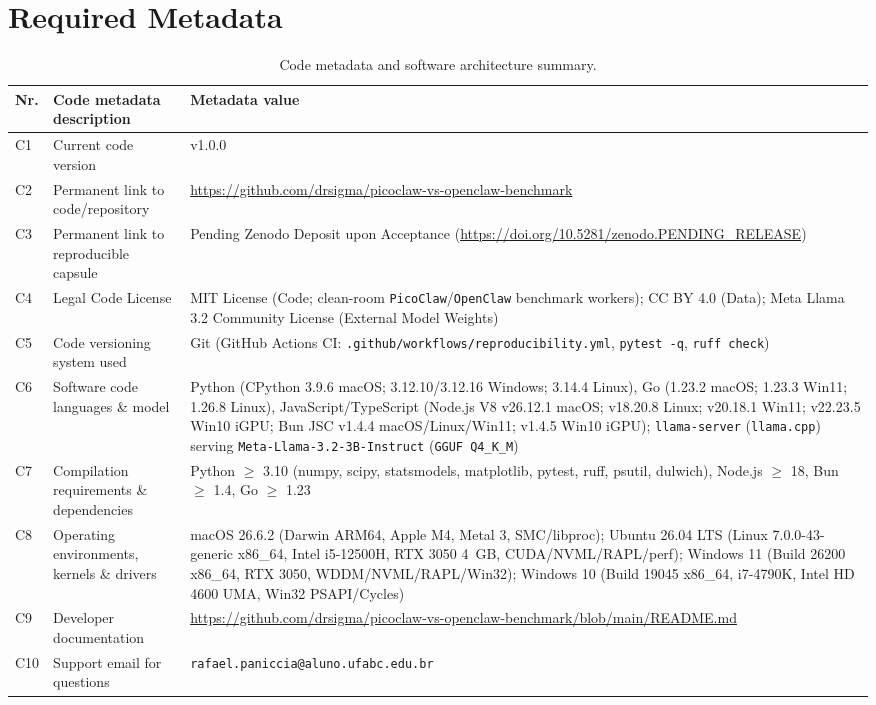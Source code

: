 \documentclass[11pt,a4paper]{article}
\begin{document}
\section*{Required Metadata}
\label{sec:metadata}

\begin{table}[h!]
\small
\centering
\begin{tabular}{|l|p{6.5cm}|p{6.5cm}|}
\hline
\textbf{Nr.} & \textbf{Code metadata description} & \textbf{Metadata value} \\
\hline
C1 & Current code version & v1.0.0 \\
\hline
C2 & Permanent link to code/repository & \url{https://github.com/drsigma/picoclaw-vs-openclaw-benchmark} \\
\hline
C3 & Permanent link to reproducible capsule & Pending Zenodo Deposit upon Acceptance (\url{https://doi.org/10.5281/zenodo.PENDING_RELEASE}) \\
\hline
C4 & Legal Code License & MIT License (Code; clean-room \texttt{PicoClaw}/\texttt{OpenClaw} benchmark workers); CC BY 4.0 (Data); Meta Llama 3.2 Community License (External Model Weights) \\
\hline
C5 & Code versioning system used & Git (GitHub Actions CI: \texttt{.github/workflows/reproducibility.yml}, \texttt{pytest -q}, \texttt{ruff check}) \\
\hline
C6 & Software code languages \& model & Python (CPython 3.9.6 macOS; 3.12.10/3.12.16 Windows; 3.14.4 Linux), Go (1.23.2 macOS; 1.23.3 Win11; 1.26.8 Linux), JavaScript/TypeScript (Node.js V8 v26.12.1 macOS; v18.20.8 Linux; v20.18.1 Win11; v22.23.5 Win10 iGPU; Bun JSC v1.4.4 macOS/Linux/Win11; v1.4.5 Win10 iGPU); \texttt{llama-server} (\texttt{llama.cpp}) serving \texttt{Meta-Llama-3.2-3B-Instruct} (\texttt{GGUF Q4\_K\_M}) \\
\hline
C7 & Compilation requirements \& dependencies & Python $\ge$ 3.10 (numpy, scipy, statsmodels, matplotlib, pytest, ruff, psutil, dulwich), Node.js $\ge$ 18, Bun $\ge$ 1.4, Go $\ge$ 1.23 \\
\hline
C8 & Operating environments, kernels \& drivers & macOS 26.6.2 (Darwin ARM64, Apple M4, Metal 3, SMC/libproc); Ubuntu 26.04 LTS (Linux 7.0.0-43-generic x86\_64, Intel i5-12500H, RTX 3050 4~GB, CUDA/NVML/RAPL/perf); Windows 11 (Build 26200 x86\_64, RTX 3050, WDDM/NVML/RAPL/Win32); Windows 10 (Build 19045 x86\_64, i7-4790K, Intel HD 4600 UMA, Win32 PSAPI/Cycles) \\
\hline
C9 & Developer documentation & \url{https://github.com/drsigma/picoclaw-vs-openclaw-benchmark/blob/main/README.md} \\
\hline
C10 & Support email for questions & \texttt{rafael.paniccia@aluno.ufabc.edu.br} \\
\hline
\end{tabular}
\caption{Code metadata and software architecture summary.}
\label{tab:code_metadata}
\end{table}
\end{document}
